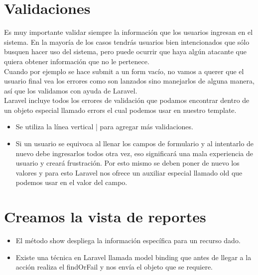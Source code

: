 \documentclass{article}
\begin{document}
\section{Validaciones}%
Es muy importante validar siempre la información que los usuarios ingresan en
el sistema. En la mayoría de los casos tendrás usuarios bien intencionados que
sólo busquen hacer uso del sistema, pero puede ocurrir que haya algún atacante
que quiera obtener información que no le pertenece.\\

Cuando por ejemplo se hace submit a un form vacío, no vamos a querer que el
usuario final vea los errores como son lanzados sino manejarlos de alguna
manera, así que los validamos con ayuda de Laravel.\\

Laravel incluye todos los errores de validación que podamos encontrar dentro de
un objeto especial llamado errors el cual podemos usar en nuestro template.\\

\begin{itemize}
  \item Se utiliza la línea vertical | para agregar más validaciones.
  \item Si un usuario se equivoca al llenar los campos de formulario y al
    intentarlo de nuevo debe ingresarlos todos otra vez, eso significará una
    mala experiencia de usuario y creará frustración. Por esto mismo se deben
    poner de nuevo los valores y para esto Laravel nos ofrece un auxiliar
    especial llamado old que podemos usar en el valor del campo.
\end{itemize}


\section{Creamos la vista de reportes}%
\begin{itemize}
  \item El método show despliega la información específica para un recurso
    dado.
  \item Existe una técnica en Laravel llamada model binding que antes de llegar
    a la acción realiza el findOrFail y nos envía el objeto que se requiere.
\end{itemize}

\end{document}
